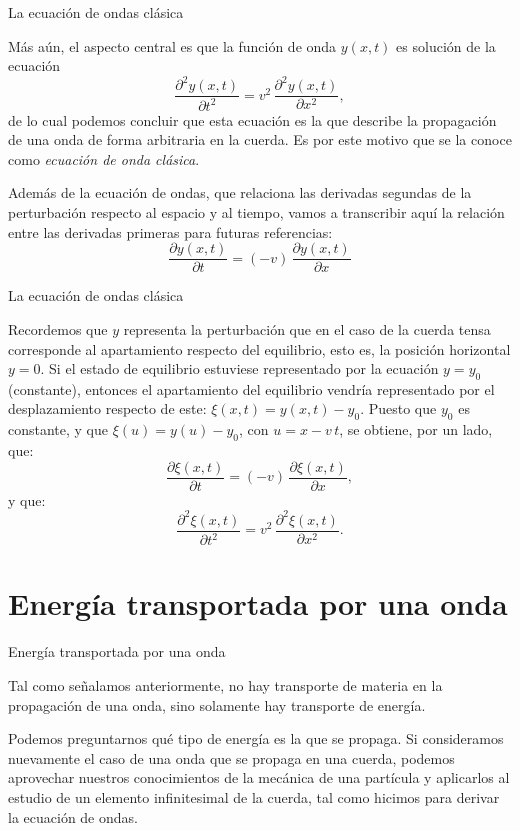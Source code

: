 \documentclass[11pt,handout,aspectratio=1610]{beamer}
\newcommand{\pdiff}[2]{\frac{\partial #1}{\partial #2}}
\newcommand{\pddiff}[2]{\frac{\partial^2 #1}{\partial #2^2}}
\newcommand{\vs}{\vspace{11pt}}
\begin{document}
\begin{frame}{La ecuación de ondas clásica}
    
    Más aún, el aspecto central es que la función de onda $y(x,t)$ es solución de la ecuación $$ \pddiff{y (x,t)}{t} = v^2 \, \pddiff{y (x,t)}{x}, $$ de lo cual podemos concluir que esta ecuación es la que describe la propagación de una onda de forma arbitraria en la cuerda. Es por este motivo que se la conoce como \emph{ecuación de onda clásica}.

    \vs

    Además de la ecuación de ondas, que relaciona las derivadas segundas de la perturbación respecto al espacio y al tiempo, vamos a transcribir aquí la relación entre las derivadas primeras para futuras referencias:
    $$ \pdiff{y(x,t)}{t} = \left(-v\right) \, \pdiff{y(x,t)}{x} $$
    
\end{frame}

\begin{frame}{La ecuación de ondas clásica}

    Recordemos que $y$ representa la perturbación que en el caso de la cuerda tensa corresponde al apartamiento respecto del equilibrio, esto es, la posición horizontal $y=0$. Si el estado de equilibrio estuviese representado por la ecuación $y=y_0$ (constante), entonces el apartamiento del equilibrio vendría representado por el desplazamiento respecto de este: $\xi(x,t) = y(x,t) - y_0$. Puesto que $y_0$ es constante, y que $\xi(u) = y(u) - y_0$, con $u= x-v\,t$, se obtiene, por un lado, que: $$ \pdiff{\xi (x,t)}{t} = \left(-v\right) \, \pdiff{\xi(x,t)}{x}, $$ y que: $$ \pddiff{\xi (x,t)}{t} = v^2 \, \pddiff{\xi (x,t)}{x}. $$
    
\end{frame}

\section{Energía transportada por una onda}

\begin{frame}{Energía transportada por una onda}

    Tal como señalamos anteriormente, no hay transporte de materia en la propagación de una onda, sino solamente hay transporte de energía. 
    
    \vs 
    
    Podemos preguntarnos qué tipo de energía es la que se propaga. Si consideramos nuevamente el caso de una onda que se propaga en una cuerda, podemos aprovechar nuestros conocimientos de la mecánica de una partícula y aplicarlos al estudio de un elemento infinitesimal de la cuerda, tal como hicimos para derivar la ecuación de ondas.

\end{frame}
\end{document}
